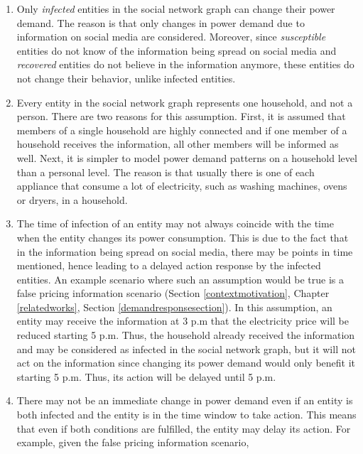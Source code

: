 \begin{enumerate}
    \item Only \textit{infected} entities in 
    the social network graph can change their power demand. The reason is 
    that only changes in power demand due to information on social media
    are considered. Moreover, since \textit{susceptible} entities
    do not know of the information being spread on social media and 
    \textit{recovered} entities do not believe in the information anymore,
    these entities do not change their behavior, 
    unlike infected entities.
    \item Every entity in the social network graph 
    represents one household, and not a person. There are 
    two reasons for this assumption. First, it is assumed that 
    members of a single household are highly connected and if one 
    member of a household receives the information, all other members
    will be informed as well. Next, it is simpler to model power demand
    patterns on a household level than a personal level. The reason
    is that usually
    there is one of each appliance that consume a lot of electricity, 
    such as washing machines, ovens or dryers, in a household.
    \item The time of infection of an entity may not
    always coincide with the time when the entity changes its 
    power consumption. This is due to the fact that in the information
    being spread on social media, there may be points in time
    mentioned, hence leading to a delayed action response by the
    infected entities. An example scenario where such an assumption
    would be true is a false pricing information scenario 
    (Section \ref{contextmotivation}, Chapter 
    \ref{relatedworks}, Section \ref{demandresponsesection}).
    In this assumption, an entity may receive the information 
    at 3 p.m that the electricity price will be reduced 
    starting 5 p.m. Thus, the household already received the
    information and may be considered as infected in the social network
    graph, but it will not act on the information since changing
    its power demand would only benefit it starting 5 p.m. Thus, its 
    action will be delayed until 5 p.m. 
    \item There may not be an immediate change 
    in power demand even if an entity is both infected and the entity 
    is in the time window to take action. This means that even if
    both conditions are fulfilled, the entity may delay its action. 
    For example, given the false pricing information scenario, 

\end{enumerate}
